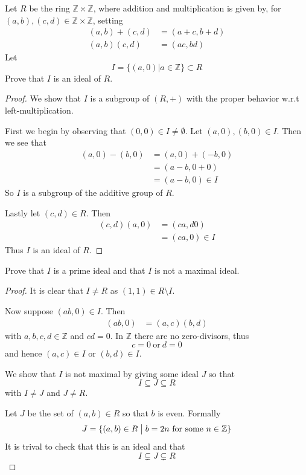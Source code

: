 \begin{prob}
    Let $R$ be the ring $\mathbb Z \times \mathbb Z$, where 
    addition and multiplication is given by, for $(a,b),(c,d)\in 
    \mathbb Z \times \mathbb Z$, setting 
    \begin{align*}
        (a,b)+(c,d)&=(a+c,b+d) \\ 
        (a,b)(c,d)&=(ac,bd)
    \end{align*}
    Let 
    \[
        I = \{(a,0) | a \in \mathbb Z\}\subset R
    \]
    Prove that $I$ is an ideal of $R$.
\end{prob}
\begin{proof}
    We show that $I$ is a subgroup of $(R,+)$ with the 
    proper behavior w.r.t left-multiplication.

    First we begin by observing that 
    $(0,0) \in I \neq \emptyset$. 
    Let $(a,0),(b,0) \in I$. 
    Then we see that 
    \begin{align*}
        (a,0)-(b,0) &= (a,0)+(-b,0) \\ 
                    &= (a-b, 0 + 0) \\ 
                    &= (a-b,0) \in I
    \end{align*}
    So $I$ is a subgroup of the additive group of $R$. 

    Lastly let $(c,d) \in R$. 
    Then 
    \begin{align*}
        (c,d)(a,0) &= (ca,d0) \\ 
                   &= (ca,0) \in I
    \end{align*}
    Thus $I$ is an ideal of $R$.
\end{proof}
\begin{prob}
    Prove that $I$ is a prime ideal and that $I$ is not 
    a maximal ideal. 
\end{prob}
\begin{proof}
    It is clear that $I \neq R$ as $(1,1) \in R \setminus I$. 

    Now suppose $(ab,0) \in I$. 
    Then 
    \begin{align*}
        (ab,0) &= (a,c)(b,d) 
    \end{align*}
    with $a,b,c,d \in \mathbb Z$ and $cd = 0$. 
    In $\mathbb Z$ there are no zero-divisors, thus 
    \[
        c = 0 \ \text{or} \ d = 0
    \]
    and hence $(a,c) \in I$ or $(b,d) \in I$.

    We show that $I$ is not maximal by giving some ideal $J$ so that 
    \[
        I \subseteq J \subseteq R
    \]
    with $I \neq J$ and $J \neq R$.

    Let $J$ be the set of $(a,b) \in R$ so that 
    $b$ is even. Formally 
    \[
        J = \{(a,b) \in R \bigm| b = 2n \ \text{for some} \ n 
        \in \mathbb Z\}
    \]
    It is trival to check that this is an ideal and 
    that 
    \[
        I \subsetneq J \subsetneq R
    \]
\end{proof}

